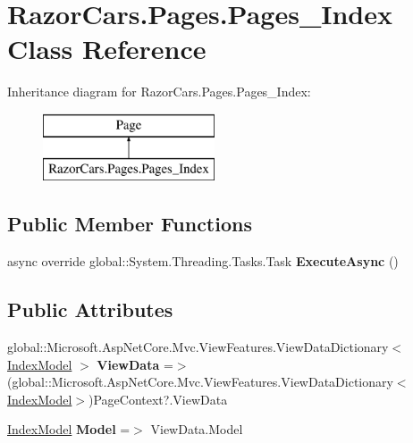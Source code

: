 \hypertarget{class_razor_cars_1_1_pages_1_1_pages___index}{}\section{Razor\+Cars.\+Pages.\+Pages\+\_\+\+Index Class Reference}
\label{class_razor_cars_1_1_pages_1_1_pages___index}
Inheritance diagram for Razor\+Cars.\+Pages.\+Pages\+\_\+\+Index\+:\begin{figure}[H]
\begin{center}
\leavevmode
\includegraphics[height=2.000000cm]{class_razor_cars_1_1_pages_1_1_pages___index}
\end{center}
\end{figure}
\subsection*{Public Member Functions}
\begin{DoxyCompactItemize}
\item 
\mbox{\label{class_razor_cars_1_1_pages_1_1_pages___index_a02fbe36cb2fc54612e2d0150832f1b86}} 
async override global\+::\+System.\+Threading.\+Tasks.\+Task {\bfseries Execute\+Async} ()
\end{DoxyCompactItemize}
\subsection*{Public Attributes}
\begin{DoxyCompactItemize}
\item 
\mbox{\label{class_razor_cars_1_1_pages_1_1_pages___index_ad9be2f5e1d2713ef180936e5af4baeee}} 
global\+::\+Microsoft.\+Asp\+Net\+Core.\+Mvc.\+View\+Features.\+View\+Data\+Dictionary$<$ \mbox{\hyperlink{class_razor_cars_1_1_pages_1_1_index_model}{Index\+Model}} $>$ {\bfseries View\+Data} =$>$ (global\+::\+Microsoft.\+Asp\+Net\+Core.\+Mvc.\+View\+Features.\+View\+Data\+Dictionary$<$\mbox{\hyperlink{class_razor_cars_1_1_pages_1_1_index_model}{Index\+Model}}$>$)Page\+Context?.View\+Data
\item 
\mbox{\label{class_razor_cars_1_1_pages_1_1_pages___index_a5152284b627ff8615085401233b7656e}} 
\mbox{\hyperlink{class_razor_cars_1_1_pages_1_1_index_model}{Index\+Model}} {\bfseries Model} =$>$ View\+Data.\+Model
\end{DoxyCompactItemize}
